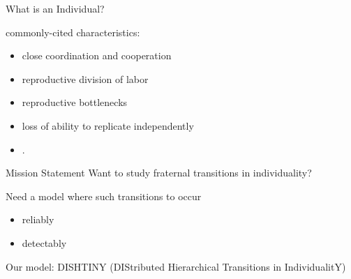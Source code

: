 \begin{frame}{What is an Individual?}

commonly-cited characteristics:
\begin{itemize}
\item close coordination and cooperation
\item reproductive division of labor
\item reproductive bottlenecks
\item loss of ability to replicate independently
\item \cite{ereshefsky2015rethinking, bouchard2013symbiotic}.
\end{itemize}

\end{frame}

\begin{frame}{Mission Statement}
Want to study fraternal transitions in individuality?

\pause

Need a model where such transitions to occur
\begin{itemize}
\item reliably
\item detectably
\end{itemize}

\pause

Our model: DISHTINY \footnotesize{(DIStributed Hierarchical Transitions in IndividualitY)}

\end{frame}
